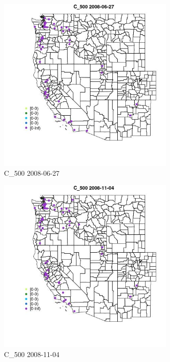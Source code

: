 \begin{figure} 
\centering  
\includegraphics[width=0.77\textwidth]{Code_Outputs/Report_ML_input_PM25_Step4_part_e_de_duplicated_aves_MapObsC_5002008-06-27.jpg} 
\caption{\label{fig:Report_ML_input_PM25_Step4_part_e_de_duplicated_avesMapObsC_5002008-06-27}C_500 2008-06-27} 
\end{figure} 
 

\begin{figure} 
\centering  
\includegraphics[width=0.77\textwidth]{Code_Outputs/Report_ML_input_PM25_Step4_part_e_de_duplicated_aves_MapObsC_5002008-11-04.jpg} 
\caption{\label{fig:Report_ML_input_PM25_Step4_part_e_de_duplicated_avesMapObsC_5002008-11-04}C_500 2008-11-04} 
\end{figure} 
 

